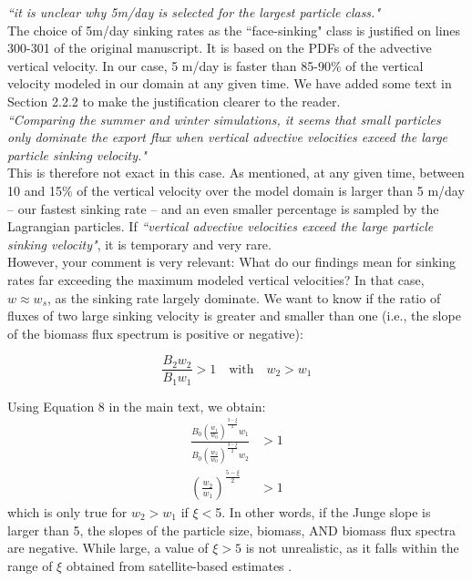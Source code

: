 \documentclass[12pt,letter]{article}
\begin{document}
\textit{``it is unclear why 5m/day is selected for the largest particle class."\\}
The choice of 5m/day sinking rates as the ``face-sinking"  class is justified on lines 300-301 of the original manuscript. It is based on the PDFs of the advective vertical velocity. In our case, 5 m/day is faster than 85-90\% of the vertical velocity modeled in our domain at any given time. We have added some text in Section 2.2.2 to make the justification clearer to the reader.\\

\textit{``Comparing the summer and winter simulations, it seems that small particles only dominate the export flux when vertical advective velocities exceed the large particle sinking velocity."\\}
This is therefore not exact in this case. As mentioned, at any given time, between 10 and 15\% of the vertical velocity over the model domain is larger than 5 m/day -- our fastest sinking rate -- and an even smaller percentage is sampled by the Lagrangian particles. If \textit{``vertical advective velocities exceed the large particle sinking velocity"}, it is temporary and very rare.\\

However, your comment is very relevant: What do our findings mean for sinking rates far exceeding the maximum modeled vertical velocities? In that case, $w \approx w_s$, as the sinking rate largely dominate. We want to know if the ratio of fluxes of two large sinking velocity is greater and smaller than one (i.e., the slope of the biomass flux spectrum is positive or negative):

\begin{equation}
	\frac{B_2w_2}{B_1w_1} >1 \quad \text{with} \quad w_2 > w_1
\end{equation}	

Using Equation 8 in the main text, we obtain:
\begin{align}
	\frac{B_0\left(\frac{w_1}{w_0}\right)^{\frac{3-\xi}{2}}w_1}{B_0\left(\frac{w_2}{w_0}\right)^{\frac{3-\xi}{2}}w_2} &> 1\\[.2cm]
	\left(\frac{w_2}{w_1}\right)^{\frac{5-\xi}{2}} &>1
\end{align}	
which is only true for $w_2 > w_1$ if $\xi<$5. In other words, if the Junge slope is larger than 5, the slopes of the particle size, biomass, AND biomass flux spectra are negative. While large, a value of $\xi>5$ is not unrealistic, as it falls within the range of $\xi$ obtained from satellite-based estimates \citep{Kostadinov_2009}.
\end{document}
